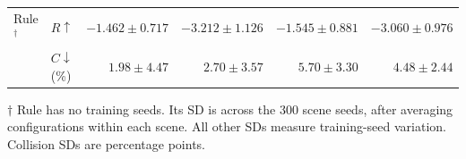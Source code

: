 {\begin{table}[!t]
\begin{tabular*}{\textwidth}{@{\extracolsep{\fill}}llrrrr@{}}
\addlinespace[2pt]
Rule$^{\dagger}$ & $R\uparrow$ & $-1.462\pm0.717$ & $-3.212\pm1.126$ & $-1.545\pm0.881$ & $-3.060\pm0.976$ \\
 & $C\downarrow$ (\%) & $1.98\pm4.47$ & $2.70\pm3.57$ & $\mathbf{5.70\pm3.30}$ & $\mathbf{4.48\pm2.44}$ \\
\bottomrule
\end{tabular*}
\par\vspace{2pt}\parbox{\textwidth}{\footnotesize
$\dagger$ Rule has no training seeds. Its SD is across the 300 scene seeds, after averaging configurations within each scene. All other SDs measure training-seed variation. Collision SDs are percentage points.}
\end{table}}

\newcommand{\HadCoreAblationTable}{%
\begin{table}[!t]
\centering\footnotesize
\setlength{\tabcolsep}{5pt}
\caption{Trained design comparisons: absolute reward $R=-D$ and friendly-collision mortality $C$, mean $\pm$ sample SD across three training seeds. Each configuration uses 300 common scenes. Bold marks the best mean among these five designs.}
\label{tab:had-core-ablation}
\begin{tabular*}{\textwidth}{@{\extracolsep{\fill}}llrrrr@{}}
\toprule
Method & Metric & ID & $K$-OOD & $N$-OOD & Joint OOD \\
\midrule
\textbf{LEAF} & $R\uparrow$ & $\mathbf{-0.405\pm0.097}$ & $\mathbf{-0.996\pm0.233}$ & $\mathbf{-0.575\pm0.235}$ & $\mathbf{-1.097\pm0.105}$ \\
 & $C\downarrow$ (\%) & $\mathbf{1.33\pm0.45}$ & $\mathbf{1.70\pm0.62}$ & $\mathbf{6.29\pm1.32}$ & $\mathbf{4.97\pm1.26}$ \\
\addlinespace[2pt]
Memory query & $R\uparrow$ & $-0.527\pm0.227$ & $-1.529\pm0.734$ & $-0.998\pm0.621$ & $-1.946\pm1.229$ \\
 & $C\downarrow$ (\%) & $1.66\pm0.86$ & $2.59\pm1.78$ & $8.57\pm4.41$ & $6.65\pm4.16$ \\
\addlinespace[2pt]
No host & $R\uparrow$ & $-0.510\pm0.138$ & $-1.768\pm0.621$ & $-1.263\pm0.653$ & $-2.319\pm0.889$ \\
 & $C\downarrow$ (\%) & $2.23\pm0.77$ & $3.67\pm1.65$ & $10.71\pm3.98$ & $8.76\pm3.14$ \\
\addlinespace[2pt]
Direct read & $R\uparrow$ & $-0.928\pm0.210$ & $-1.958\pm0.457$ & $-2.020\pm0.446$ & $-3.196\pm0.687$ \\
 & $C\downarrow$ (\%) & $3.34\pm1.66$ & $4.46\pm2.10$ & $11.16\pm1.81$ & $9.17\pm2.18$ \\

\end{tabular*}
\end{table}}
